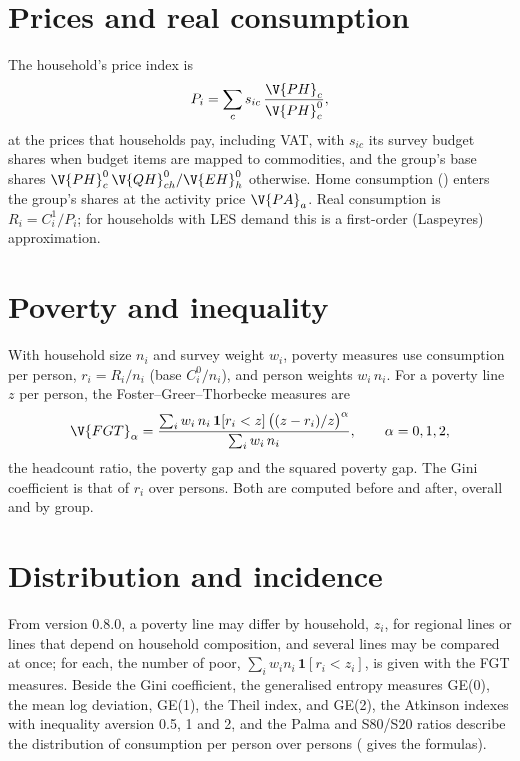 \section{Prices and real consumption}

The household's price index is
\begin{equation*}
P_i = \sum_c s_{ic}\,\frac{\V{PH}_c}{\V{PH}^0_c},
\end{equation*}
at the prices that households pay, including VAT, with $s_{ic}$ its survey
budget shares when budget items are mapped to commodities, and the group's
base shares $\V{PH}^0_c\,\V{QH}^0_{ch} / \V{EH}^0_h$ otherwise. Home
consumption () enters the group's shares at the activity
price $\V{PA}_a$. Real consumption is $R_i = C^1_i / P_i$; for households with LES
demand this is a first-order (Laspeyres) approximation.

\section{Poverty and inequality}

With household size $n_i$ and survey weight $w_i$, poverty measures use
consumption per person, $r_i = R_i / n_i$ (base $C^0_i / n_i$), and person
weights $w_i\,n_i$. For a poverty line $z$ per person, the
Foster--Greer--Thorbecke measures are
\begin{equation*}
\V{FGT}_\alpha = \frac{\sum_i w_i\,n_i\,\mathbf{1}[r_i < z]\,\bigl((z - r_i)/z\bigr)^\alpha}{\sum_i w_i\,n_i},
\qquad \alpha = 0, 1, 2,
\end{equation*}
the headcount ratio, the poverty gap and the squared poverty gap. The Gini
coefficient is that of $r_i$ over persons. Both are computed before and after,
overall and by group.

\section{Distribution and incidence}

From version 0.8.0, a poverty line may differ by household, $z_i$, for
regional lines or lines that depend on household composition, and several
lines may be compared at once; for each, the number of poor,
$\sum_i w_i n_i\,\mathbf{1}[r_i < z_i]$, is given with the FGT measures.
Beside the Gini coefficient, the generalised entropy measures GE(0), the mean
log deviation, GE(1), the Theil index, and GE(2), the Atkinson indexes with
inequality aversion 0.5, 1 and 2, and the Palma and S80/S20 ratios describe
the distribution of consumption per person over persons
( gives the formulas).

